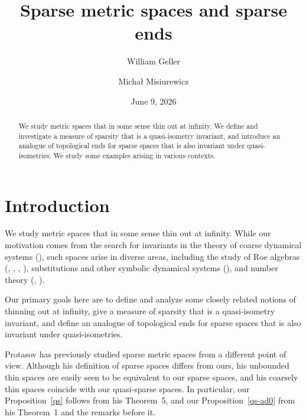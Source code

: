 \documentclass[12pt]{amsart}
\theoremstyle{definition}
\theoremstyle{remark}
\numberwithin{equation}{section}
\begin{document}
\title{Sparse metric spaces and sparse ends}

\author{William Geller}
\address{Department of Mathematical Sciences, IU Indianapolis, 402 N. Blackford
  Street, Indianapolis, IN 46202}

\author{Micha{\l} Misiurewicz}
\address{Department of Mathematical Sciences, IU Indianapolis, 402 N. Blackford
  Street, Indianapolis, IN 46202}


\date{June 9, 2026}

\begin{abstract}
We study metric spaces that in some sense thin out at infinity. We
define and investigate a measure of sparsity that is a quasi-isometry
invariant, and introduce an analogue of topological ends for sparse
spaces that is also invariant under quasi-isometries. We study some
examples arising in various contexts.
\end{abstract}

\maketitle


\section{Introduction}\label{intro}

We study metric spaces that in some sense thin out at infinity. While
our motivation comes from the search for invariants in the theory of
coarse dynamical systems (\cite{GM1}), such spaces arise in diverse areas,
including the study of Roe algebras (\cite{BCL}, \cite{BFV}, \cite{CMS}, \cite{WW}),
substitutions and other symbolic dynamical systems (\cite{LM}), and number
theory (\cite{M}, \cite{Z}).

Our primary goals here are to define and analyze some closely related
notions of thinning out at infinity, give a measure of sparsity that
is a quasi-isometry invariant, and define an analogue of topological
ends for sparse spaces that is also invariant under quasi-isometries.

Protasov \cite{P} has previously studied sparse metric spaces from a
different point of view. Although his definition of sparse spaces
differs from ours, his unbounded thin spaces are easily seen to be
equivalent to our sparse spaces, and his coarsely thin spaces coincide
with our quasi-sparse spaces. In particular, our Proposition~\ref{qs}
follows from his Theorem~5, and our Proposition~\ref{qs-ad0} from his
Theorem~1 and the remarks before it.
\end{document}
